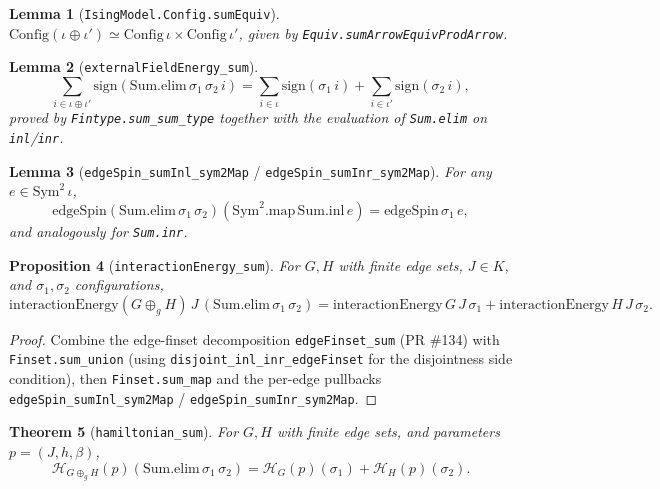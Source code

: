\documentclass[a4paper,11pt]{article}
\newtheorem{theorem}{Theorem}
\newtheorem{lemma}[theorem]{Lemma}
\newtheorem{proposition}[theorem]{Proposition}
\begin{document}
\begin{lemma}[\texttt{IsingModel.Config.sumEquiv}]
$\mathrm{Config}(\iota \oplus \iota')
  \simeq \mathrm{Config}\,\iota \times \mathrm{Config}\,\iota'$,
given by \texttt{Equiv.sumArrowEquivProdArrow}.
\end{lemma}

\begin{lemma}[\texttt{externalFieldEnergy\_sum}]
\[
  \sum_{i \in \iota \oplus \iota'}
    \mathrm{sign}(\mathrm{Sum.elim}\,\sigma_1\,\sigma_2\,i)
  = \sum_{i \in \iota} \mathrm{sign}(\sigma_1\,i)
    + \sum_{i \in \iota'} \mathrm{sign}(\sigma_2\,i),
\]
proved by \texttt{Fintype.sum\_sum\_type} together with the evaluation
of \texttt{Sum.elim} on \texttt{inl}/\texttt{inr}.
\end{lemma}

\begin{lemma}[\texttt{edgeSpin\_sumInl\_sym2Map} /
\texttt{edgeSpin\_sumInr\_sym2Map}]
For any $e \in \mathrm{Sym}^2\,\iota$,
\[
  \mathrm{edgeSpin}(\mathrm{Sum.elim}\,\sigma_1\,\sigma_2)
    (\mathrm{Sym}^2.\mathrm{map}\,\mathrm{Sum.inl}\,e)
  = \mathrm{edgeSpin}\,\sigma_1\,e,
\]
and analogously for \texttt{Sum.inr}.
\end{lemma}

\begin{proposition}[\texttt{interactionEnergy\_sum}]
For $G, H$ with finite edge sets, $J \in K$, and
$\sigma_1, \sigma_2$ configurations,
\[
  \mathrm{interactionEnergy}(G \oplus_g H)\,J\,(\mathrm{Sum.elim}\,\sigma_1\,\sigma_2)
  = \mathrm{interactionEnergy}\,G\,J\,\sigma_1
    + \mathrm{interactionEnergy}\,H\,J\,\sigma_2.
\]
\end{proposition}

\begin{proof}
Combine the edge-finset decomposition \texttt{edgeFinset\_sum} (PR \#134)
with \texttt{Finset.sum\_union} (using
\texttt{disjoint\_inl\_inr\_edgeFinset} for the disjointness side
condition), then \texttt{Finset.sum\_map} and the per-edge pullbacks
\texttt{edgeSpin\_sumInl\_sym2Map} / \texttt{edgeSpin\_sumInr\_sym2Map}.
\end{proof}

\begin{theorem}[\texttt{hamiltonian\_sum}]
For $G, H$ with finite edge sets, and parameters $p = (J, h, \beta)$,
\[
  \mathcal{H}_{G \oplus_g H}(p)(\mathrm{Sum.elim}\,\sigma_1\,\sigma_2)
  = \mathcal{H}_G(p)(\sigma_1) + \mathcal{H}_H(p)(\sigma_2).
\]
\end{theorem}
\end{document}
